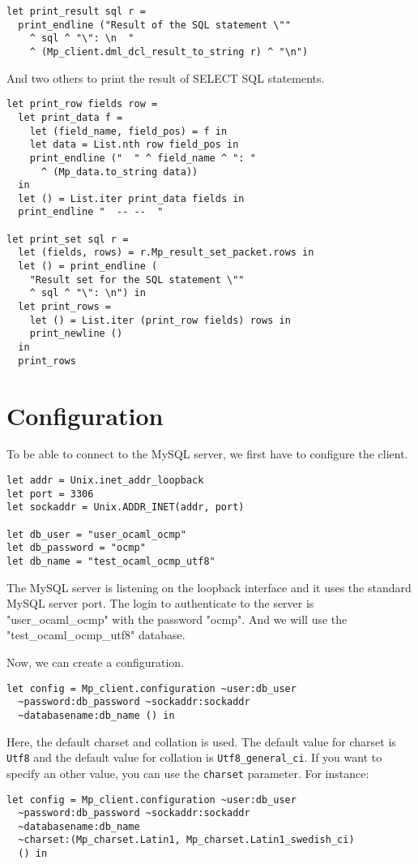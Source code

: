 \documentclass[a4paper, english, 11pt]{article}
\begin{document}
\begin{verbatim}
let print_result sql r = 
  print_endline ("Result of the SQL statement \"" 
    ^ sql ^ "\": \n  " 
    ^ (Mp_client.dml_dcl_result_to_string r) ^ "\n")
\end{verbatim}

And two others to print the result of SELECT SQL statements.

\begin{verbatim}
let print_row fields row = 
  let print_data f = 
    let (field_name, field_pos) = f in
    let data = List.nth row field_pos in
    print_endline ("  " ^ field_name ^ ": " 
      ^ (Mp_data.to_string data))
  in
  let () = List.iter print_data fields in
  print_endline "  -- --  "

let print_set sql r = 
  let (fields, rows) = r.Mp_result_set_packet.rows in
  let () = print_endline (
    "Result set for the SQL statement \"" 
    ^ sql ^ "\": \n") in
  let print_rows =   
    let () = List.iter (print_row fields) rows in
    print_newline ()
  in
  print_rows
\end{verbatim}

\section{Configuration}

To be able to connect to the MySQL server, we first have to configure the client.

\begin{verbatim}
let addr = Unix.inet_addr_loopback
let port = 3306
let sockaddr = Unix.ADDR_INET(addr, port)

let db_user = "user_ocaml_ocmp"
let db_password = "ocmp"
let db_name = "test_ocaml_ocmp_utf8"
\end{verbatim}

The MySQL server is listening on the loopback interface and it uses the standard MySQL server port. The login to authenticate to the server is "user\_ocaml\_ocmp" with the password "ocmp". And we will use the "test\_ocaml\_ocmp\_utf8" database.

Now, we can create a configuration.

\begin{verbatim}
let config = Mp_client.configuration ~user:db_user
  ~password:db_password ~sockaddr:sockaddr 
  ~databasename:db_name () in
\end{verbatim}

Here, the default charset and collation is used. The default value for charset is \texttt{Utf8} and the default value for collation is \texttt{Utf8\_general\_ci}. If you want to specify an other value, you can use the \texttt{charset} parameter. For instance:
\begin{verbatim}
let config = Mp_client.configuration ~user:db_user 
  ~password:db_password ~sockaddr:sockaddr 
  ~databasename:db_name 
  ~charset:(Mp_charset.Latin1, Mp_charset.Latin1_swedish_ci)
  () in
\end{verbatim}
\end{document}
